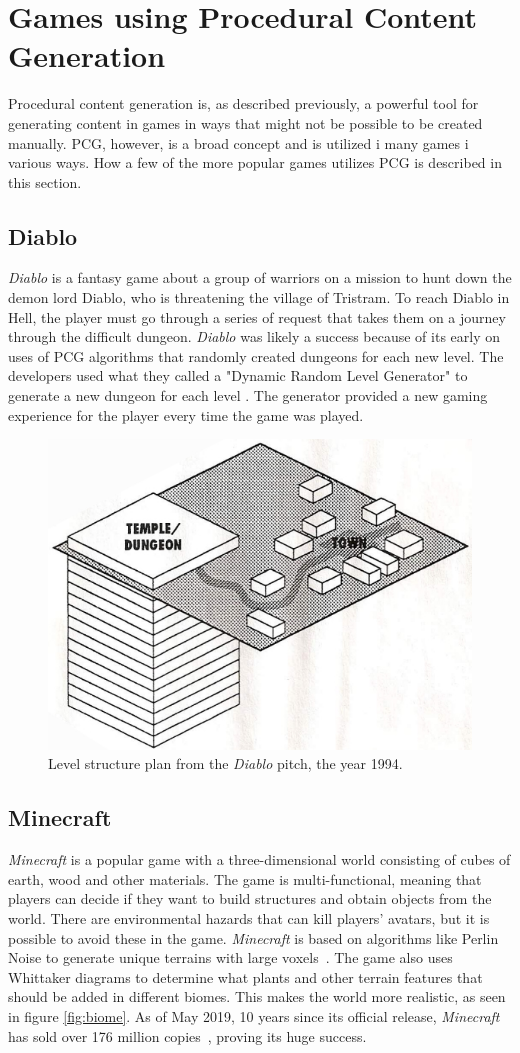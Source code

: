\section{Games using Procedural Content Generation}
Procedural content generation is, as described previously, a powerful tool for generating content in games in ways that might not be possible to be created manually. PCG, however, is a broad concept and is utilized i many games i various ways. How a few of the more popular games utilizes PCG is described in this section. 

\subsection{Diablo}
\textit{Diablo} is a fantasy game about a group of warriors on a mission to hunt down the demon lord Diablo, who is threatening the village of Tristram. To reach Diablo in Hell, the player must go through a series of request that takes them on a journey through the difficult dungeon. \textit{Diablo} was likely a success because of its early on uses of PCG algorithms that randomly created dungeons for each new level. The developers used what they called a "Dynamic Random Level Generator" to generate a new dungeon for each level \cite{Diablo_PCG}. The generator provided a new gaming experience for the player every time the game was played. 

\begin{figure}[H]
    \centering
    \includegraphics[width=0.5\linewidth]{Planning report/images/diablo.jpg}
    \caption{Level structure plan from the \textit{Diablo} pitch, the year 1994.}
    \label{fig:diablo_plan}
\end{figure}{}


\subsection{Minecraft}
\textit{Minecraft} is a popular game with a three-dimensional world consisting of cubes of earth, wood and other materials. The game is multi-functional, meaning that players can decide if they want to build structures and obtain objects from the world. There are environmental hazards that can kill players' avatars, but it is possible to avoid these in the game. \textit{Minecraft} is based on algorithms like Perlin Noise to generate unique terrains with large voxels~\cite{minecraft_PCG}. The game also uses Whittaker diagrams to determine what plants and other terrain features that should be added in different biomes. This makes the world more realistic, as seen in figure \ref{fig:biome}. As of May 2019, 10 years since its official release, \textit{Minecraft} has sold over 176 million copies~\cite{Minecraft_10ys}, proving its huge success.

